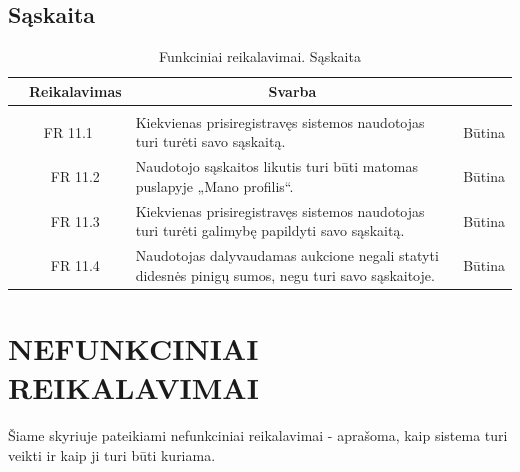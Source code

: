 \documentclass{VUMIFPSkursinis}
\begin{document}
	\subsection{Sąskaita}
	\begin{table}[H]
		\caption{Funkciniai reikalavimai. Sąskaita}
		\begin{tabular}{|p{1cm}|p{1cm}|p{}|p{}|}
			\hline 
			\rowcolor{gray!50}
			\multicolumn{2}{|c|}{{\bfseries Kodas}}&
			\multicolumn{1}{c|}{{\bfseries Reikalavimas}}&
			\multicolumn{1}{c|}{{\bfseries Svarba}}\\
			\hline
			\rowcolor{lightgray}
			\multicolumn{4}{|c|}{Sąskaita}\\				
			\hline
			\multicolumn{2}{|c|}{FR 11.1}&
			{Kiekvienas prisiregistravęs sistemos naudotojas turi turėti savo sąskaitą.
			}&		
			\multicolumn{1}{c|}{Būtina}\\
			\hline
			\multicolumn{1}{|c}{}&
			\multicolumn{1}{c|}{FR 11.2}&
			{Naudotojo sąskaitos likutis turi būti matomas puslapyje „Mano profilis“.
			}&		
			\multicolumn{1}{c|}{Būtina}\\
			\hline	
			\multicolumn{1}{|c}{}&
			\multicolumn{1}{c|}{FR 11.3}&
			{Kiekvienas prisiregistravęs sistemos naudotojas turi turėti galimybę papildyti savo sąskaitą.
			}&
			\multicolumn{1}{c|}{Būtina}\\									
			\hline
			\multicolumn{1}{|c}{}&
			\multicolumn{1}{c|}{FR 11.4}&
			{Naudotojas dalyvaudamas aukcione negali statyti didesnės pinigų sumos, negu turi savo sąskaitoje.
			}&
			\multicolumn{1}{c|}{Būtina}\\									
			\hline
		\end{tabular}		
	\end{table}
	\newpage
	
	\section{NEFUNKCINIAI REIKALAVIMAI}
	Šiame skyriuje pateikiami nefunkciniai reikalavimai - aprašoma, kaip sistema turi veikti ir kaip ji turi būti kuriama.
\end{document}
